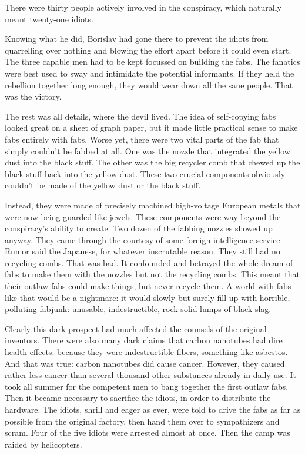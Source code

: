 \documentclass[20 pt,twoside,extrafontsizes,final]{memoir}
\begin{document}
There were thirty people actively involved in the conspiracy, which naturally meant twenty-one idiots. 

Knowing what he did, Borislav had gone there to prevent the idiots from quarrelling over nothing and blowing the effort apart before it could even start. The three capable men had to be kept focussed on building the fabs. The fanatics were best used to sway and intimidate the potential informants. If they held the rebellion together long enough, they would wear down all the sane people. That was the victory.

The rest was all details, where the devil lived. The idea of self-copying fabs looked great on a sheet of graph paper, but it made little practical sense to make fabs entirely with fabs. Worse yet, there were two vital parts of the fab that simply couldn't be fabbed at all. One was the nozzle that integrated the yellow dust into the black stuff. The other was the big recycler comb that chewed up the black stuff back into the yellow dust. These two crucial components obviously couldn't be made of the yellow dust or the black stuff.

Instead, they were made of precisely machined high-voltage European metals that were now being guarded like jewels. These components were way beyond the conspiracy's ability to create.
Two dozen of the fabbing nozzles showed up anyway. They came through the courtesy of some foreign intelligence service. Rumor said the Japanese, for whatever inscrutable reason.
They still had no recycling combs. That was bad. It confounded and betrayed the whole dream of fabs to make them with the nozzles but not the recycling combs. This meant that their outlaw fabs could make things, but never recycle them. A world with fabs like that would be a nightmare: it would slowly but surely fill up with horrible, polluting fabjunk: unusable, indestructible, rock-solid lumps of black slag.

Clearly this dark prospect had much affected the counsels of the original inventors. There were also many dark claims that carbon nanotubes had dire health effects: because they were indestructible fibers, something like asbestos. And that was true: carbon nanotubes did cause cancer. However, they caused rather less cancer than several thousand other substances already in daily use. It took all summer for the competent men to bang together the first outlaw fabs. Then it became necessary to sacrifice the idiots, in order to distribute the hardware. The idiots, shrill and eager as ever, were told to drive the fabs as far as possible from the original factory, then hand them over to sympathizers and scram. Four of the five idiots were arrested almost at once. Then the camp was raided by helicopters.
\end{document}
